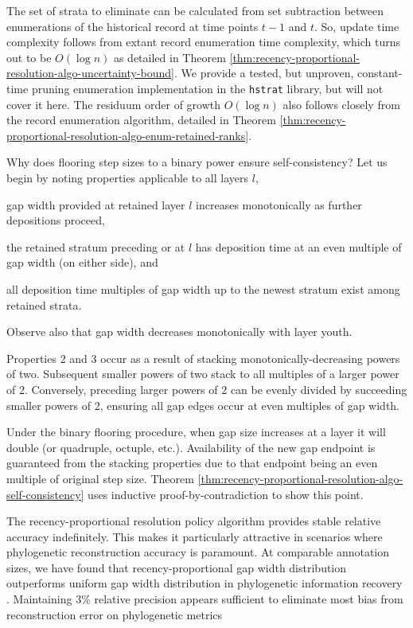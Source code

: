 The set of strata to eliminate can be calculated from set subtraction between enumerations of the historical record at time points $t-1$ and $t$.
So, update time complexity follows from extant record enumeration time complexity, which turns out to be $O(\log n)$ as detailed in Theorem \ref{thm:recency-proportional-resolution-algo-uncertainty-bound}.
We provide a tested, but unproven, constant-time pruning enumeration implementation in the \texttt{hstrat} library, but will not cover it here.
The residuum order of growth $O(\log n)$ also follows closely from the record enumeration algorithm, detailed in Theorem \ref{thm:recency-proportional-resolution-algo-enum-retained-ranks}.

Why does flooring step sizes to a binary power ensure self-consistency?
Let us begin by noting properties applicable to all layers $l$,
\begin{enumeration}
\item gap width provided at retained layer $l$ increases monotonically as further depositions proceed,
\item the retained stratum preceding or at $l$ has deposition time at an even multiple of gap width (on either side), and
\item all deposition time multiples of gap width up to the newest stratum exist among retained strata.
\end{enumeration}
Observe also that gap width decreases monotonically with layer youth.

Properties 2 and 3 occur as a result of stacking monotonically-decreasing powers of two.
Subsequent smaller powers of two stack to all multiples of a larger power of 2.
Conversely, preceding larger powers of 2 can be evenly divided by succeeding smaller powers of 2, ensuring all gap edges occur at even multiples of gap width.

Under the binary flooring procedure, when gap size increases at a layer it will double (or quadruple, octuple, etc.).
Availability of the new gap endpoint is guaranteed from the stacking properties due to that endpoint being an even multiple of original step size.
Theorem \ref{thm:recency-proportional-resolution-algo-self-consistency} uses inductive proof-by-contradiction to show this point.

The recency-proportional resolution policy algorithm provides stable relative accuracy indefinitely.
This makes it particularly attractive in scenarios where phylogenetic reconstruction accuracy is paramount.
At comparable annotation sizes, we have found that recency-proportional gap width distribution outperforms uniform gap width distribution in phylogenetic information recovery \citep{moreno2022hereditary}.
Maintaining 3\% relative precision appears sufficient to eliminate most bias from reconstruction error on phylogenetic metrics \citep{moreno2023toward}

